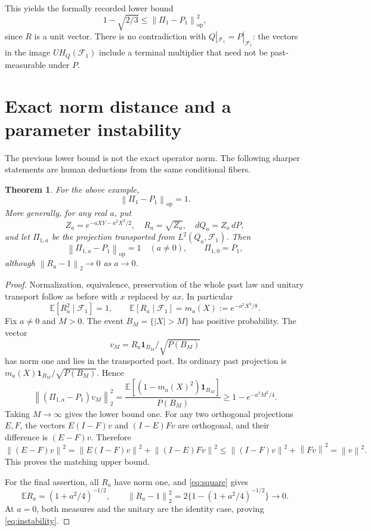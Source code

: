 \documentclass[11pt]{article}
\newtheorem{theorem}{Theorem}[section]
\theoremstyle{remark}\newtheorem{remark}[theorem]{Remark}
\newcommand{\E}{\mathbb E}
\newcommand{\F}{\mathcal F}
\newcommand{\norm}[1]{\left\lVert#1\right\rVert}
\begin{document}
This yields the formally recorded lower bound
\[
 1-\sqrt{2/3}\le\norm{\Pi_1-P_1}_{\mathrm{op}}^2,
\]
since $R$ is a unit vector. There is no contradiction with $Q|_{\F_1}=P|_{\F_1}$: the vectors in the image $U H_Q(\F_1)$ include a terminal multiplier that need not be past-measurable under $P$.

\section{Exact norm distance and a parameter instability}
The previous lower bound is not the exact operator norm. The following sharper statements are human deductions from the same conditional fibers.

\begin{theorem}\label{thm:normone}
For the above example,
\[
 \norm{\Pi_1-P_1}_{\mathrm{op}}=1.
\]
More generally, for any real $a$, put
\[
 Z_a=e^{-aXY-a^2X^2/2},\quad R_a=\sqrt{Z_a},\quad dQ_a=Z_a\,dP,
\]
and let $\Pi_{1,a}$ be the projection transported from $L^2(Q_a,\F_1)$. Then
\begin{equation}\label{eq:instability}
 \norm{\Pi_{1,a}-P_1}_{\mathrm{op}}=1\quad(a\ne0),\qquad
 \Pi_{1,0}=P_1,
\end{equation}
although $\norm{R_a-1}_2\to0$ as $a\to0$.
\end{theorem}
\begin{proof}
Normalization, equivalence, preservation of the whole past law and unitary transport follow as before with $x$ replaced by $ax$. In particular
\[
 \E[R_a^2\mid\F_1]=1,\qquad
 \E[R_a\mid\F_1]=m_a(X):=e^{-a^2X^2/8}.
\]
Fix $a\ne0$ and $M>0$. The event $B_M=\{|X|>M\}$ has positive probability. The vector
\[
 v_M=R_a\mathbf1_{B_M}/\sqrt{P(B_M)}
\]
has norm one and lies in the transported past. Its ordinary past projection is $m_a(X)\mathbf1_{B_M}/\sqrt{P(B_M)}$. Hence
\[
 \norm{(\Pi_{1,a}-P_1)v_M}_2^2
 =\frac{\E[(1-m_a(X)^2)\mathbf1_{B_M}]}{P(B_M)}
 \ge1-e^{-a^2M^2/4}.
\]
Taking $M\to\infty$ gives the lower bound one. For any two orthogonal projections $E,F$, the vectors $E(I-F)v$ and $(I-E)Fv$ are orthogonal, and their difference is $(E-F)v$. Therefore
\[
 \norm{(E-F)v}^2
 =\norm{E(I-F)v}^2+\norm{(I-E)Fv}^2
 \le\norm{(I-F)v}^2+\norm{Fv}^2=\norm{v}^2.
\]
This proves the matching upper bound.

For the final assertion, all $R_a$ have norm one, and \eqref{eq:square} gives
\[
 \E R_a=(1+a^2/4)^{-1/2},\qquad
 \norm{R_a-1}_2^2=2\{1-(1+a^2/4)^{-1/2}\}\longrightarrow0.
\]
At $a=0$, both measures and the unitary are the identity case, proving \eqref{eq:instability}.
\end{proof}
\end{document}
